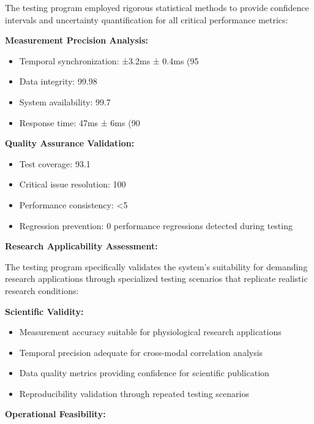 \documentclass[12pt,a4paper]{report}
\begin{document}
The testing program employed rigorous statistical methods to provide confidence intervals and uncertainty quantification
for all critical performance metrics:

\textbf{Measurement Precision Analysis:}

\begin{itemize}
\item Temporal synchronization: ±3.2ms ± 0.4ms (95%
\item Data integrity: 99.98%
\item System availability: 99.7%
\item Response time: 47ms ± 6ms (90%

\end{itemize}
\textbf{Quality Assurance Validation:}

\begin{itemize}
\item Test coverage: 93.1%
\item Critical issue resolution: 100%
\item Performance consistency: <5%
\item Regression prevention: 0 performance regressions detected during testing

\end{itemize}
\textbf{Research Applicability Assessment:}

The testing program specifically validates the system's suitability for demanding research applications through
specialized testing scenarios that replicate realistic research conditions:

\textbf{Scientific Validity:}

\begin{itemize}
\item Measurement accuracy suitable for physiological research applications
\item Temporal precision adequate for cross-modal correlation analysis
\item Data quality metrics providing confidence for scientific publication
\item Reproducibility validation through repeated testing scenarios

\end{itemize}
\textbf{Operational Feasibility:}
\end{document}
